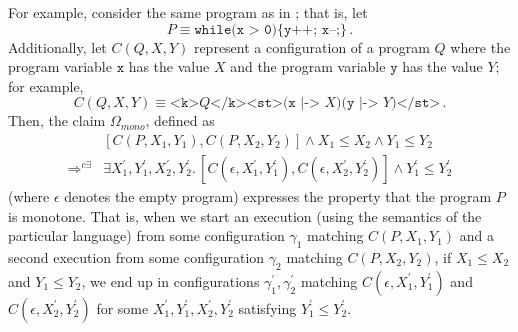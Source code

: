 For example, consider the same program as in ; that is, let
\begin{equation*}
  P \equiv \texttt{while(x > 0)\{ y++; x--;\}} \, .
\end{equation*}
Additionally, let $C(Q, X, Y)$ represent a configuration of a program $Q$
where the program variable $\texttt{x}$ has the value $X$
and the program variable $\texttt{y}$ has the value $Y$;
for example,
\begin{equation}\label{eqn:CQXY}
 C(Q, X, Y) \equiv \texttt{<k>} Q \texttt{</k><st>(x |-> } X \texttt{)(y |-> } Y \texttt{)</st>}    \, .
\end{equation}
Then, the claim $\Omega_{\textit{mono}}$, defined as
\begin{align*}
&[C(P, X_1, Y_1),C(P, X_2, Y_2)] \land X_1 \leq X_2 \land Y_1 \leq Y_2
\\ \Rightarrow^{c\exists} &
\exists X^\prime_1, Y^\prime_1, X^\prime_2, Y^\prime_2.\,  [C(\epsilon, X^\prime_1, Y^\prime_1), C(\epsilon, X^\prime_2, Y^\prime_2)] \land Y^\prime_1 \leq Y^\prime_2   
\end{align*}
(where $\epsilon$ denotes the empty program)
expresses the property that the program $P$ is monotone.
That is, when we start an execution (using the semantics of the particular language)
from some configuration $\gamma_1$ matching $C(P, X_1, Y_1)$
and a second execution from some configuration $\gamma_2$ matching $C(P, X_2, Y_2)$,
if $X_1 \leq X_2$ and $Y_1 \leq Y_2$,
we end up in configurations $\gamma_1^\prime,\gamma_2^\prime$ matching
$C(\epsilon, X^\prime_1, Y^\prime_1)$ and $C(\epsilon, X^\prime_2, Y^\prime_2)$
for some $X^\prime_1,Y^\prime_1,X^\prime_2,Y^\prime_2$
satisfying $Y^\prime_1 \leq Y^\prime_2$.

